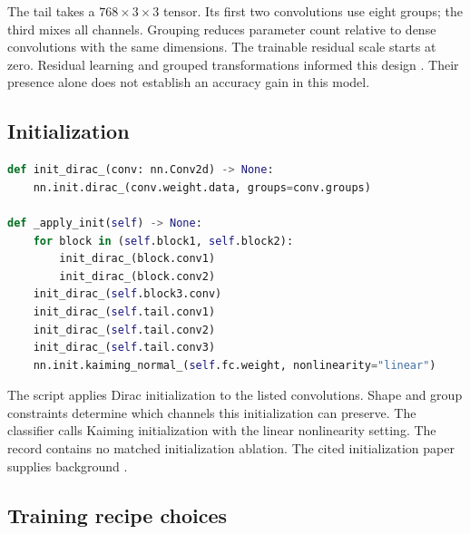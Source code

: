 \documentclass[11pt]{article}
\begin{document}
The tail takes a $768 \times 3 \times 3$ tensor. Its first two convolutions use eight groups; the third mixes all channels. Grouping reduces parameter count relative to dense convolutions with the same dimensions. The trainable residual scale starts at zero. Residual learning and grouped transformations informed this design \cite{he2016resnet,xie2017resnext}. Their presence alone does not establish an accuracy gain in this model.

\subsection{Initialization}

\begin{lstlisting}[language=Python,caption={Initialization pattern}]
def init_dirac_(conv: nn.Conv2d) -> None:
    nn.init.dirac_(conv.weight.data, groups=conv.groups)

def _apply_init(self) -> None:
    for block in (self.block1, self.block2):
        init_dirac_(block.conv1)
        init_dirac_(block.conv2)
    init_dirac_(self.block3.conv)
    init_dirac_(self.tail.conv1)
    init_dirac_(self.tail.conv2)
    init_dirac_(self.tail.conv3)
    nn.init.kaiming_normal_(self.fc.weight, nonlinearity="linear")
\end{lstlisting}

The script applies Dirac initialization to the listed convolutions. Shape and group constraints determine which channels this initialization can preserve. The classifier calls Kaiming initialization with the linear nonlinearity setting. The record contains no matched initialization ablation. The cited initialization paper supplies background \cite{he2015rectifiers}.

\subsection{Training recipe choices}
\end{document}
